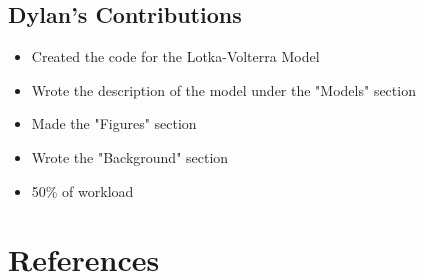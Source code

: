 \documentclass[11pt]{article}
\begin{document}
\subsection{Dylan's Contributions}
\begin{itemize}
    \item Created the code for the Lotka-Volterra Model
    \item Wrote the description of the model under the "Models" section
    \item Made the "Figures" section
    \item Wrote the "Background" section
    \item 50\% of workload
\end{itemize}

\section{References}

 \\


\noindent {}
\end{document}
